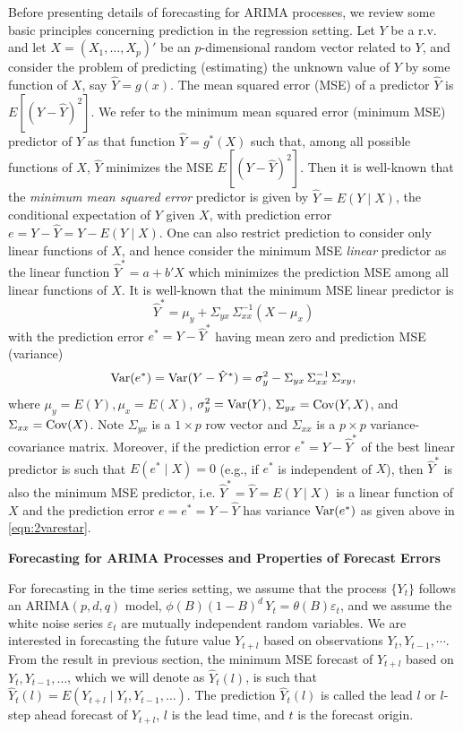 Before presenting details of forecasting for ARIMA processes, we review some basic principles concerning prediction in the regression setting. Let $Y$ be a r.v. and let $X = (X_1, \ldots, X_p)'$ be an $p$-dimensional random vector related to $Y$, and consider the problem of predicting (estimating) the unknown value of $Y$ by some function of $X$, say $\hat{Y} = g(x)$. The mean squared error (MSE) of a predictor $\hat{Y}$ is $E[(Y - \hat{Y})^2]$. We refer to the minimum mean squared error (minimum MSE) predictor of $Y$ as that function $\hat{Y} = g^*(X)$ such that, among all possible functions of $X$, $\hat{Y}$ minimizes the MSE $E[(Y - \hat{Y})^2]$. Then it is well-known that the \emph{minimum mean squared error} predictor is given by $\hat{Y} = E(Y\;|\;X)$, the conditional expectation of $Y$ given $X$, with prediction error $e = Y - \hat{Y} = Y - E(Y\;|\;X)$. One can also restrict prediction to consider only linear functions of $X$, and hence consider the minimum MSE \emph{linear} predictor as the linear function $\hat{Y}^* = a + b' X$ which minimizes the prediction MSE among all linear functions of $X$. It is well-known that the minimum MSE linear predictor is
	\begin{equation} \label{eqn:2yhatstar}
	\hat{Y}^* = \mu_y + \Sigma_{yx}\,\Sigma_{xx}^{-1}(X - \mu_x)
	\end{equation}
with the prediction error $e^* = Y - \hat{Y}^*$ having mean zero and prediction MSE (variance)
	\begin{equation} \label{eqn:2varestar}
	\var(e^*) = \var(Y - \hat{Y}^*) = \sigma_y^2 - \Sigma_{yx}\,\Sigma_{xx}^{-1}\,\Sigma_{xy},
	\end{equation}
where $\mu_y = E(Y), \mu_x = E(X)$, $\sigma_y^2 = \operatorname{Var}(Y)$, $\Sigma_{yx} = \operatorname{Cov}(Y,X)$, and $\Sigma_{xx} = \operatorname{Cov}(X)$. Note $\Sigma_{yx}$ is a $1 \times p$ row vector and $\Sigma_{xx}$ is a $p \times p$ variance-covariance matrix. Moreover, if the prediction error $e^* = Y - \hat{Y}^*$ of the best linear predictor is such that $E(e^*\;|\;X) = 0$ (e.g., if $e^*$ is independent of $X$), then $\hat{Y}^*$ is also the minimum MSE predictor, i.e. $\hat{Y}^* = \hat{Y} = E(Y\;|\;X)$ is a linear function of $X$ and the prediction error $e = e^* = Y - \hat{Y}$ has variance $\operatorname{Var}(e^*)$ as given above in \eqref{eqn:2varestar}. \twomedskip


\noindent\textbf{Forecasting for ARIMA Processes and Properties of Forecast Errors} \twomedskip


For forecasting in the time series setting, we assume that the process $\{ Y_t \}$ follows an ARIMA$(p,d,q)$ model, $\phi(B)(1 - B)^d\,  Y_t = \theta(B) \varepsilon_t$, and we assume the white noise series $\varepsilon_t$ are mutually independent random variables. We are interested in forecasting the future value $Y_{t+l}$ based on observations $Y_t,Y_{t-1},\cdots$. From the result in previous section, the minimum MSE forecast of $Y_{t+l}$ based on $Y_t, Y_{t-1}, \ldots$, which we will denote as $\hat{Y}_t(l)$, is such that $\hat{Y}_t(l) = E(Y_{t+l} \;|\; Y_t,Y_{t-1},\ldots)$. The prediction $\hat{Y}_t(l)$ is called the lead $l$ or $l$-step ahead forecast of $Y_{t+l}$, $l$ is the lead time, and $t$ is the forecast origin.



